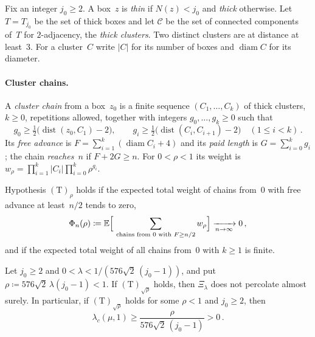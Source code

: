 \documentclass[11pt,letterpaper]{article}
\begin{document}
Fix an integer $j_0\ge2$. A box~$z$ is \emph{thin} if $N(z)<j_0$ and \emph{thick} otherwise. Let $T=T_{j_0}$ be the set of thick boxes and let $\mathcal C$ be the set of connected components of~$T$ for $2$-adjacency, the \emph{thick clusters}. Two distinct clusters are at distance at least~$3$. For a cluster~$C$ write $\lvert C\rvert$ for its number of boxes and $\operatorname{diam}C$ for its diameter.

\paragraph{Cluster chains.} A \emph{cluster chain} from a box~$z_0$ is a finite sequence $(C_1,\dots,C_k)$ of thick clusters, $k\ge0$, repetitions allowed, together with integers $g_0,\dots,g_k\ge0$ such that
\begin{equation}
\label{eq:gaps}
  g_0\ge\tfrac12\bigl(\operatorname{dist}(z_0,C_1)-2\bigr),\qquad g_i\ge\tfrac12\bigl(\operatorname{dist}(C_i,C_{i+1})-2\bigr)\quad(1\le i<k)\,.
\end{equation}
Its \emph{free advance} is $F=\sum_{i=1}^k(\operatorname{diam}C_i+4)$ and its \emph{paid length} is $G=\sum_{i=0}^kg_i$; the chain \emph{reaches}~$n$ if $F+2G\ge n$. For $0<\rho<1$ its weight is $w_\rho=\prod_{i=1}^k\lvert C_i\rvert\prod_{i=0}^k\rho^{g_i}$.

\begin{definition}
\label{def:T}
Hypothesis $\mathrm{(T)}_\rho$ holds if the expected total weight of chains from~$0$ with free advance at least~$n/2$ tends to zero,
\begin{equation}
\label{eq:T}
  \Phi_n(\rho)\coloneqq\mathbb E\Bigl[\ \sum_{\text{chains from }0\text{ with }F\ge n/2}w_\rho\Bigr]\xrightarrow[n\to\infty]{}0\,,
\end{equation}
and if the expected total weight of all chains from~$0$ with $k\ge1$ is finite.
\end{definition}

\begin{theorem}
\label{thm:main}
Let $j_0\ge2$ and $0<\lambda<1/(576\sqrt2\,(j_0-1))$, and put $\rho\coloneqq576\sqrt2\,\lambda(j_0-1)<1$. If $\mathrm{(T)}_{\sqrt\rho}$ holds, then $\Xi_\lambda$ does not percolate almost surely. In particular, if $\mathrm{(T)}_{\sqrt\rho}$ holds for some $\rho<1$ and $j_0\ge2$, then
\begin{equation*}
  \lambda_c(\mu,1)\ge\frac{\rho}{576\sqrt2\,(j_0-1)}>0\,.
\end{equation*}
\end{theorem}
\end{document}
